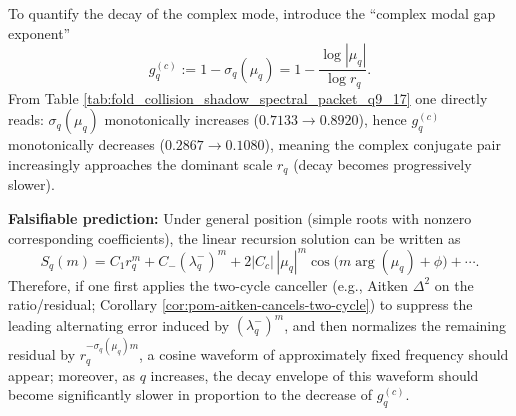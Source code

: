 \begin{remark}
\par
To quantify the decay of the complex mode, introduce the ``complex modal gap exponent''
\[
g_q^{(c)}:=1-\sigma_q(\mu_q)
=1-\frac{\log|\mu_q|}{\log r_q}.
\]
From Table \ref{tab:fold_collision_shadow_spectral_packet_q9_17} one directly reads: \(\sigma_q(\mu_q)\) monotonically increases (\(0.7133\to 0.8920\)), hence
\(
g_q^{(c)}
\)
monotonically decreases (\(0.2867\to 0.1080\)), meaning the complex conjugate pair increasingly approaches the dominant scale \(r_q\) (decay becomes progressively slower).
\par
\textbf{Falsifiable prediction:}
Under general position (simple roots with nonzero corresponding coefficients), the linear recursion solution can be written as
\[
S_q(m)=C_1 r_q^m + C_- (\lambda_q^-)^m + 2|C_c|\,|\mu_q|^m\cos\!\bigl(m\arg(\mu_q)+\phi\bigr)+\cdots.
\]
Therefore, if one first applies the two-cycle canceller (e.g., Aitken \(\Delta^2\) on the ratio/residual; Corollary \ref{cor:pom-aitken-cancels-two-cycle}) to suppress the leading alternating error induced by \((\lambda_q^-)^m\), and then normalizes the remaining residual by \(r_q^{-\sigma_q(\mu_q)m}\), a cosine waveform of approximately fixed frequency should appear; moreover, as \(q\) increases, the decay envelope of this waveform should become significantly slower in proportion to the decrease of \(g_q^{(c)}\).
\end{remark}

